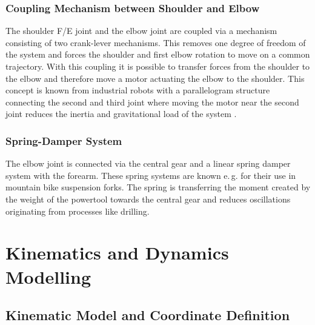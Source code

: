 \documentclass[twocolumn,10pt]{IFTOMM}
\begin{document}
\subsubsection{Coupling Mechanism between Shoulder and Elbow}

The shoulder F/E joint and the elbow joint are coupled via a mechanism consisting of two crank-lever mechanisms.
This removes one degree of freedom of the system and forces the shoulder and first elbow rotation to move on a common trajectory.
With this coupling it is possible to transfer forces from the shoulder to the elbow and therefore move a motor actuating the elbow to the shoulder.
This concept is known from industrial robots with a parallelogram structure connecting the second and third joint where moving the motor near the second joint reduces the inertia and gravitational load of the system \cite{LuhZhe1985}.

\subsubsection{Spring-Damper System}

The elbow joint is connected via the central gear and a linear spring damper system with the forearm.
These spring systems are known e.\,g. for their use in mountain bike suspension forks.
The spring is transferring the moment created by the weight of the powertool towards the central gear and reduces oscillations originating from processes like drilling.

\section{Kinematics and Dynamics Modelling}
\label{sec:model}

\subsection{Kinematic Model and Coordinate Definition}
\end{document}
